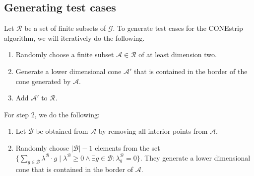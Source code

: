 \documentclass{article}
\theoremstyle{mytheorem}
\newtheorem{question}[theorem]{Question}
\newcommand{\set}[1]{\ensuremath{\{ #1 \} }} %
\begin{document}
\clearpage
\subsection{Generating test cases}
Let $\mathcal{R}$ be a set of finite subsets of $\mathcal{G}$. To generate test cases for the CONEstrip algorithm, we will iteratively do the following.
\begin{enumerate}
    \item Randomly choose a finite subset $\mathcal{A} \in \mathcal{R}$ of at least dimension two.
    \item Generate a lower dimensional cone $\mathcal{A}'$ that is contained in the border of the cone generated by $\mathcal{A}$.
    \item Add $\mathcal{A}'$ to $\mathcal{R}$.
\end{enumerate}

\vspace{0.5cm}
\noindent
For step 2, we do the following:
\begin{enumerate}
    \item Let $\mathcal{B}$ be obtained from $\mathcal{A}$ by removing all interior points from $\mathcal{A}$.
    \item Randomly choose $|\mathcal{B}| - 1$ elements from the set 
    $\set{\sum\limits_{g \in \mathcal{B}} \lambda^\mathcal{B} \cdot g \mid \lambda^\mathcal{B} \geq 0 \land \exists g \in \mathcal{B}: \lambda^\mathcal{B}_g = 0}$. They generate a lower dimensional cone that is contained in the border of
    $\mathcal{A}$.
\end{enumerate}



\end{document}
